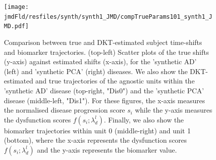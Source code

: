 \documentclass{llncs}
\begin{document}



\begin{figure}[htp]
\texttt{[image: \\jmdFld/resfiles/synth/synth1\_JMD/compTrueParams101\_synth1\_JMD.pdf]}
 \caption[DKT Simulation Results - Comparison between true and DKT-estimated biomarker trajectories and subject time-shifts.]{Comparison between true and DKT-estimated subject time-shifts and biomarker trajectories. (top-left) Scatter plots of the true shifts (y-axis) against estimated shifts (x-axis), for the 'synthetic AD' (left) and 'synthetic PCA' (right) diseases. We also show the DKT-estimated and true trajectories of the agnostic units within the 'synthetic AD' disease (top-right, "Dis0") and the 'synthetic PCA' disease (middle-left, "Dis1"). For these figures, the x-axis measures the normalised disease progression score $s_i$ while the y-axis measures the dysfunction scores $f(s_i;\lambda_d^l)$. Finally, we also show the biomarker trajectories within unit 0 (middle-right) and unit 1 (bottom), where the x-axis represents the dysfunction scores $f(s_i;\lambda_d^l)$ and the y-axis represents the biomarker value.}
 \label{fig:dktSynthTrajCompTrue}
\end{figure}
\end{document}
